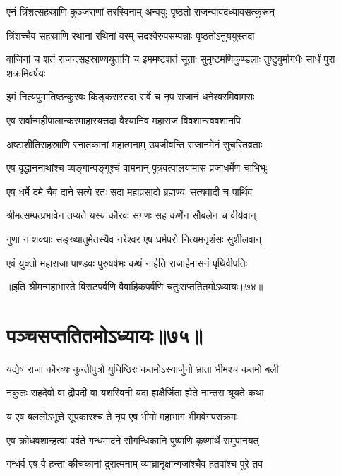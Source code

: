 \twolineshloka
{एनं त्रिंशत्सहस्राणि कुञ्जराणां तरस्विनाम्}
{अन्वयुः पृष्ठतो राजन्यावदध्यावसत्कुरून्}


\twolineshloka
{त्रिंशच्चैव सहस्राणि रथानां रथिनां वरम्}
{सदश्वैरुपसम्पन्नाः पृष्ठतोऽनुययुस्तदा}


\threelineshloka
{वाजिनां च शतं राजन्त्सहस्राण्ययुतानि च}
{इममष्टशतं सूताः सुमृष्टमणिकुण्डलाः}
{तुष्टुवुर्मागधैः सार्धं पुरा शक्रमिवर्षयः}


\twolineshloka
{इमं नित्यपुमातिष्ठन्कुरवः किङ्करास्तदा}
{सर्वे च नृप राजानं धनेश्वरमिवामराः}


\twolineshloka
{एष सर्वान्महीपालान्करमाहारयत्तदा}
{वैश्यानिव महाराज विवशान्स्ववशानपि}


\twolineshloka
{अष्टाशीतिसहस्राणि स्नातकानां महात्मनाम्}
{उपजीवन्ति राजानमेनं सुचरितव्रताः}


\twolineshloka
{एष वृद्धाननाथांश्च व्यङ्गान्पङ्गूश्चं वामनान्}
{पुत्रवत्पालयामास प्रजाधर्मेण चाभिभूः}


\twolineshloka
{एष धर्मे दमे चैव दाने सत्ये रतः सदा}
{महाप्रसादो ब्रह्मण्यः सत्यवादी च पार्थिवः}


\twolineshloka
{श्रीमत्सम्पत्प्रभावेन तप्यते यस्य कौरवः}
{सगणः सह कर्णेन सौबलेन च वीर्यवान्}


\twolineshloka
{गुणा न शक्याः सङ्ख्यातुमेतस्यैव नरेश्वर}
{एष धर्मपरो नित्यमनृशंसः सुशीलवान्}


\twolineshloka
{एवं युक्तो महाराजा पाण्डवः पुरुषर्षभः}
{कथं नार्हति राजार्हमासनं पृथिवीपतिः}

॥इति श्रीमन्महाभारते विराटपर्वणि वैवाहिकपर्वणि चतुःसप्ततितमोऽध्यायः॥७४॥

\chapter{पञ्चसप्ततितमोऽध्यायः॥७५॥}

\twolineshloka
{यद्येष राजा कौरव्यः कुन्तीपुत्रो युधिष्ठिरः}
{कतमोऽस्यार्जुनो भ्राता भीमश्च कतमो बली}


\twolineshloka
{नकुलः सहदेवो वा द्रौपदी वा यशस्विनी}
{यदा ह्यक्षैर्जिता ह्येते नान्तरा श्रूयते कथा}




\twolineshloka
{य एष बललोऽभूत्ते सूपकारश्च ते नृप}
{एष भीमो महाभाग भीमवेगपराक्रमः}


\twolineshloka
{एष क्रोधवशान्हत्वा पर्वते गन्धमादने}
{सौगन्धिकानि पुष्पाणि कृष्णार्थे समुपानयत्}


\twolineshloka
{गन्धर्व एष वै हन्ता कीचकानां दुरात्मनाम्}
{व्याघ्रानृक्षान्गजांश्चैव हतवांश्च पुरे तव}


